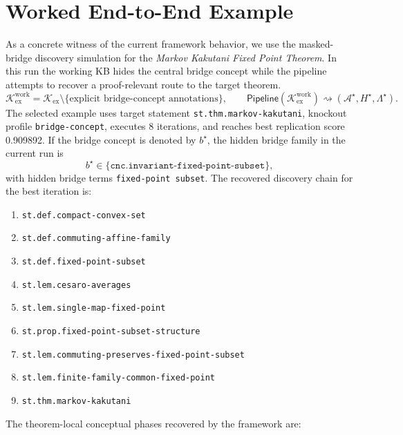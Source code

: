 \documentclass[11pt]{article}
\begin{document}
\section{Worked End-to-End Example}
As a concrete witness of the current framework behavior, we use the masked-bridge discovery simulation for the \textit{Markov Kakutani Fixed Point Theorem}. In this run the working KB hides the central bridge concept while the pipeline attempts to recover a proof-relevant route to the target theorem.
\[
\mathcal{K}^{\mathrm{work}}_{\mathrm{ex}} = \mathcal{K}_{\mathrm{ex}} \setminus \{\text{explicit bridge-concept annotations}\},
\qquad
\mathsf{Pipeline}(\mathcal{K}^{\mathrm{work}}_{\mathrm{ex}}) \rightsquigarrow (\mathcal{A}^{\star}, H^{\star}, \Lambda^{\star}).
\]
The selected example uses target statement \texttt{st.thm.markov-kakutani}, knockout profile \texttt{bridge-concept}, executes 8 iterations, and reaches best replication score 0.909892.
If the bridge concept is denoted by $b^{\star}$, the hidden bridge family in the current run is
\[
b^{\star} \in \{\texttt{cnc.invariant-fixed-point-subset}\},
\]
with hidden bridge terms \texttt{fixed-point subset}.
The recovered discovery chain for the best iteration is:
\begin{enumerate}[leftmargin=*,itemsep=0.2em]
\item \texttt{st.def.compact-convex-set}
\item \texttt{st.def.commuting-affine-family}
\item \texttt{st.def.fixed-point-subset}
\item \texttt{st.lem.cesaro-averages}
\item \texttt{st.lem.single-map-fixed-point}
\item \texttt{st.prop.fixed-point-subset-structure}
\item \texttt{st.lem.commuting-preserves-fixed-point-subset}
\item \texttt{st.lem.finite-family-common-fixed-point}
\item \texttt{st.thm.markov-kakutani}
\end{enumerate}
The theorem-local conceptual phases recovered by the framework are:
\end{document}
